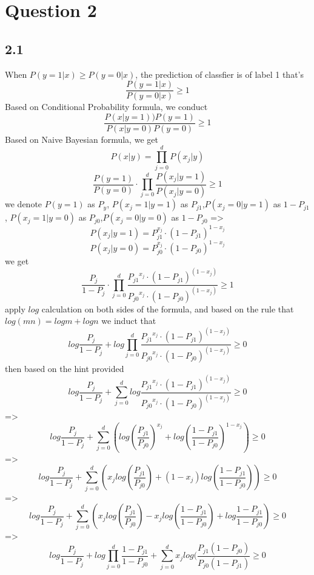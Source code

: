 \documentclass[a4paper,12pt]{article}
\begin{document}
\newpage

\section*{Question 2}
\subsection*{2.1}
When $P(y=1|x) \geq P(y=0|x)$, the prediction of classfier is of label 1
that's
$$\frac{P(y=1|x)}{P(y=0|x)} \geq 1$$
Based on Conditional Probability formula, we conduct
$$\frac{P(x|y=1))P(y=1)}{P(x|y=0)P(y=0)} \geq 1$$
Based on Naive Bayesian formula, we get
$$P(x|y) =  \prod\limits_{j=0}^d P(x_j|y)$$
$$\frac{P(y=1)}{P(y=0)} \cdot \prod\limits_{j=0}^d \frac{P(x_j|y=1)}{P(x_j|y=0)} \geq 1$$
we denote $P(y=1)$ as $P_{y}$,
$P(x_j=1|y=1)$ as $P_{j1}$,$P(x_j=0|y=1)$ as $1 - P_{j1}$,
$P(x_j=1|y=0)$ as $P_{j0}$,$P(x_j=0|y=0)$ as $1 - P_{j0}$
=>
$$P(x_j|y=1) = P_{j1}^{x_j} \cdot (1 - P_{j1})^{1-x_j}$$
$$P(x_j|y=0) = P_{j0}^{x_j} \cdot (1 - P_{j0})^{1-x_j}$$
we get 
$$\frac{P_j} {1-P_j} \cdot \prod\limits_{j=0}^d 
\frac{ { P_{j1} } ^ {x_j}  \cdot { {(1-P_{j1})} ^ {(1-x_j)} } }
     { { P_{j0} } ^ {x_j}  \cdot { {(1-P_{j0})} ^ {(1-x_j)} } }
     \geq 1
$$
apply $log$ calculation on both sides of the formula, and based on the rule that $log(mn) = logm + logn$
we induct that
$$log\frac{P_j} {1-P_j} + log \prod\limits_{j=0}^d 
\frac{ { P_{j1} } ^ {x_j}  \cdot { {(1-P_{j1})} ^ {(1-x_j)} } }
     { { P_{j0} } ^ {x_j}  \cdot { {(1-P_{j0})} ^ {(1-x_j)} } }
     \geq 0
$$
then based on the hint provided
$$log\frac{P_j} {1-P_j} + \sum\limits_{j=0}^d log
\frac{ { P_{j1} } ^ {x_j}  \cdot { {(1-P_{j1})} ^ {(1-x_j)} } }
     { { P_{j0} } ^ {x_j}  \cdot { {(1-P_{j0})} ^ {(1-x_j)} } }
     \geq 0
$$
=>
$$log\frac{P_j} {1-P_j} 
+ 
\sum\limits_{j=0}^d (log
{(\frac{ { P_{j1} } }
{ { P_{j0} } } )} ^ {x_j} 
+ 
log
{(\frac{ { 1 - P_{j1} } }
{ { 1- P_{j0} } } )} ^ {1 - x_j} )
     \geq 0
$$
=>
$$log\frac{P_j} {1-P_j} 
+ 
\sum\limits_{j=0}^d (
x_j log {(\frac{ { P_{j1} } }
{ { P_{j0} } } )} 
+ 
{(1 - x_j) log}{(\frac{ { 1 - P_{j1} } }
{ { 1- P_{j0} } } )} )
     \geq 0
$$
=>
$$log\frac{P_j} {1-P_j} 
+ 
\sum\limits_{j=0}^d 
(x_j log {(\frac{ { P_{j1} } }
{ { P_{j0} } } )} - 
{ x_j log (\frac{ { 1 - P_{j1} } }
{ { 1- P_{j0} } } )} + log \frac{1-P_{j1}}{1-P_{j0}})
     \geq 0
$$
=>
$$log\frac{P_j} {1-P_j} 
+ log \prod\limits_{j=0}^d  \frac{1-P_{j1}}{1-P_{j0}} 
+ 
\sum\limits_{j=0}^d 
x_j log {(\frac{  P_{j1} (1 - P_{j0})  }
{  P_{j0} (1-P_{j1}) } }   
     \geq 0
$$
\end{document}
